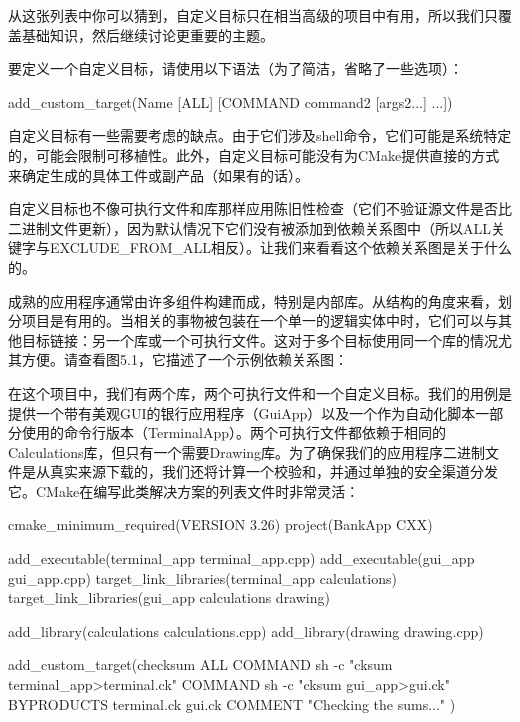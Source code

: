 从这张列表中你可以猜到，自定义目标只在相当高级的项目中有用，所以我们只覆盖基础知识，然后继续讨论更重要的主题。

要定义一个自定义目标，请使用以下语法（为了简洁，省略了一些选项）：

\begin{shell}
add_custom_target(Name [ALL] [COMMAND command2 [args2...] ...])
\end{shell}

自定义目标有一些需要考虑的缺点。由于它们涉及shell命令，它们可能是系统特定的，可能会限制可移植性。此外，自定义目标可能没有为CMake提供直接的方式来确定生成的具体工件或副产品（如果有的话）。

自定义目标也不像可执行文件和库那样应用陈旧性检查（它们不验证源文件是否比二进制文件更新），因为默认情况下它们没有被添加到依赖关系图中（所以ALL关键字与EXCLUDE\_FROM\_ALL相反）。让我们来看看这个依赖关系图是关于什么的。


成熟的应用程序通常由许多组件构建而成，特别是内部库。从结构的角度来看，划分项目是有用的。当相关的事物被包装在一个单一的逻辑实体中时，它们可以与其他目标链接：另一个库或一个可执行文件。这对于多个目标使用同一个库的情况尤其方便。请查看图5.1，它描述了一个示例依赖关系图：


在这个项目中，我们有两个库，两个可执行文件和一个自定义目标。我们的用例是提供一个带有美观GUI的银行应用程序（GuiApp）以及一个作为自动化脚本一部分使用的命令行版本（TerminalApp）。两个可执行文件都依赖于相同的Calculations库，但只有一个需要Drawing库。为了确保我们的应用程序二进制文件是从真实来源下载的，我们还将计算一个校验和，并通过单独的安全渠道分发它。CMake在编写此类解决方案的列表文件时非常灵活：


\begin{cmake}
cmake_minimum_required(VERSION 3.26)
project(BankApp CXX)

add_executable(terminal_app terminal_app.cpp)
add_executable(gui_app gui_app.cpp)
target_link_libraries(terminal_app calculations)
target_link_libraries(gui_app calculations drawing)

add_library(calculations calculations.cpp)
add_library(drawing drawing.cpp)

add_custom_target(checksum ALL
    COMMAND sh -c "cksum terminal_app>terminal.ck"
    COMMAND sh -c "cksum gui_app>gui.ck"
    BYPRODUCTS terminal.ck gui.ck
    COMMENT "Checking the sums..."
)
\end{cmake}

